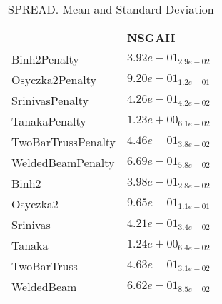 \documentclass{article}
\begin{document}
\begin{table}
\caption{SPREAD. Mean and Standard Deviation}
\label{table: SPREAD}
\centering
\begin{scriptsize}
\begin{tabular}{ll}
\hline &  NSGAII\\
\hline 
Binh2Penalty & \cellcolor{gray95}$  3.92e-01_{ 2.9e-02}$ \\
Osyczka2Penalty & \cellcolor{gray95}$  9.20e-01_{ 1.2e-01}$ \\
SrinivasPenalty & \cellcolor{gray95}$  4.26e-01_{ 4.2e-02}$ \\
TanakaPenalty & \cellcolor{gray95}$  1.23e+00_{ 6.1e-02}$ \\
TwoBarTrussPenalty & \cellcolor{gray95}$  4.46e-01_{ 3.8e-02}$ \\
WeldedBeamPenalty & \cellcolor{gray95}$  6.69e-01_{ 5.8e-02}$ \\
Binh2 & \cellcolor{gray95}$  3.98e-01_{ 2.8e-02}$ \\
Osyczka2 & \cellcolor{gray95}$  9.65e-01_{ 1.1e-01}$ \\
Srinivas & \cellcolor{gray95}$  4.21e-01_{ 3.4e-02}$ \\
Tanaka & \cellcolor{gray95}$  1.24e+00_{ 6.4e-02}$ \\
TwoBarTruss & \cellcolor{gray95}$  4.63e-01_{ 3.1e-02}$ \\
WeldedBeam & \cellcolor{gray95}$  6.62e-01_{ 8.5e-02}$ \\
\hline
\end{tabular}
\end{scriptsize}
\end{table}
\end{document}
